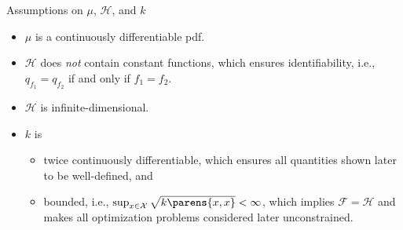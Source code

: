 \documentclass[aspectratio=169,xcolor=dvipsnames]{beamer}
\newcommand{\calH}{\mathcal{H}}
\newcommand{\calX}{\mathcal{X}}
\begin{document}
%	
%
%	
%	
%	
%


\begin{frame}{Assumptions on $\mu$, $\mathcal{H}$, and $k$}
	
	\begin{itemize}
		\item $\mu$ is a continuously differentiable pdf. %
		
		\vspace{5pt}
		
		\item $\mathcal{H}$ does \emph{not} contain constant functions, which ensures identifiability, i.e., $q_{f_1} = q_{f_2}$ if and only if $f_1 = f_2$. 
		
		\vspace{5pt}
		
		\item $\calH$ is infinite-dimensional. 
		
		\vspace{5pt}
		
		\item $k$ is 
		\begin{itemize}
			\item twice continuously differentiable, which ensures all quantities shown later to be well-defined, and 
			\item bounded, i.e., $\sup_{x \in \mathcal{X}} \sqrt{k \parens{x, x}} < \infty$, which implies $\mathcal{F} = \mathcal{H}$ and makes all optimization problems considered later unconstrained.
		\end{itemize}
		
	\end{itemize}
	
\end{frame}
\end{document}
